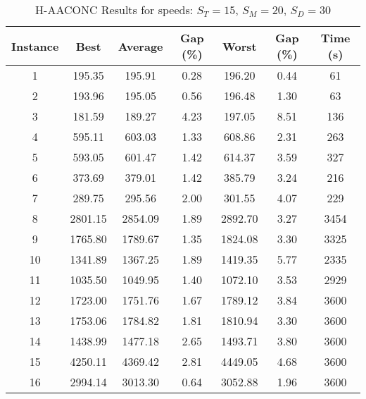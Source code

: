 \begin{table}[h]
	\centering
	\caption{H-AACONC Results for speeds: $S_T=15$, $S_M=20$, $S_D=30$}
	\begin{tabular}{@{}ccccccc@{}}
		\midrule
		\textbf{Instance} & \textbf{Best} & \textbf{Average} & \textbf{Gap (\%)} & \textbf{Worst} & \textbf{Gap (\%)} & \textbf{Time (s)} \\ \midrule
		1  & 195.35 & 195.91 & 0.28 & 196.20 & 0.44 & 61   \\ \midrule
		2  & 193.96 & 195.05 & 0.56 & 196.48 & 1.30 & 63 \\ \midrule
		3  & 181.59 & 189.27 & 4.23 & 197.05 & 8.51 & 136 \\ \midrule
		4  & 595.11 & 603.03 & 1.33 & 608.86 & 2.31 & 263 \\ \midrule
		5  & 593.05 & 601.47 & 1.42 & 614.37 & 3.59 & 327 \\ \midrule
		6  & 373.69 & 379.01 & 1.42 & 385.79 & 3.24 & 216 \\ \midrule
		7  & 289.75 & 295.56 & 2.00 & 301.55 & 4.07 & 229 \\ \midrule
		8  & 2801.15 & 2854.09 & 1.89 & 2892.70 & 3.27 & 3454 \\ \midrule
		9  & 1765.80 & 1789.67 & 1.35 & 1824.08 & 3.30 & 3325 \\ \midrule
		10 & 1341.89 & 1367.25 & 1.89 & 1419.35 & 5.77 & 2335 \\ \midrule
		11 & 1035.50 & 1049.95 & 1.40 & 1072.10 & 3.53 & 2929 \\ \midrule
		12 & 1723.00 & 1751.76 & 1.67 & 1789.12 & 3.84 & 3600 \\ \midrule
		13 & 1753.06 & 1784.82 & 1.81 & 1810.94 & 3.30 & 3600 \\ \midrule
		14 & 1438.99 & 1477.18 & 2.65 & 1493.71 & 3.80 & 3600 \\ \midrule
		15 & 4250.11 & 4369.42 & 2.81 & 4449.05 & 4.68 & 3600 \\ \midrule
		16 & 2994.14 & 3013.30 & 0.64 & 3052.88 & 1.96 & 3600 \\ \midrule
	\end{tabular}
	\label{table:ACO_15-20-30}
\end{table}
